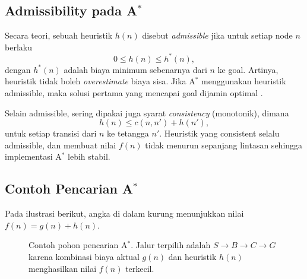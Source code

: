 \subsection{Admissibility pada A$^\ast$}
Secara teori, sebuah heuristik $h(n)$ disebut \emph{admissible} jika untuk setiap node $n$ berlaku
$$0 \le h(n) \le h^\ast(n),$$
dengan $h^\ast(n)$ adalah biaya minimum sebenarnya dari $n$ ke goal. Artinya, heuristik tidak boleh \emph{overestimate} biaya sisa. Jika A$^\ast$ menggunakan heuristik admissible, maka solusi pertama yang mencapai goal dijamin optimal \cite{hart1968formal,russell2010artificial}.

Selain admissible, sering dipakai juga syarat \emph{consistency} (monotonik), dimana
$$h(n) \le c(n,n') + h(n'),$$
untuk setiap transisi dari $n$ ke tetangga $n'$. Heuristik yang consistent selalu admissible, dan membuat nilai $f(n)$ tidak menurun sepanjang lintasan sehingga implementasi A$^\ast$ lebih stabil.


\subsection{Contoh Pencarian A$^\ast$}
Pada ilustrasi berikut, angka di dalam kurung menunjukkan nilai $f(n)=g(n)+h(n)$.

\begin{figure}[H]
    \centering
    \caption{Contoh pohon pencarian A$^\ast$. Jalur terpilih adalah $S \rightarrow B \rightarrow C \rightarrow G$ karena kombinasi biaya aktual $g(n)$ dan heuristik $h(n)$ menghasilkan nilai $f(n)$ terkecil.}
    \label{fig:contoh-astar}
\end{figure}

